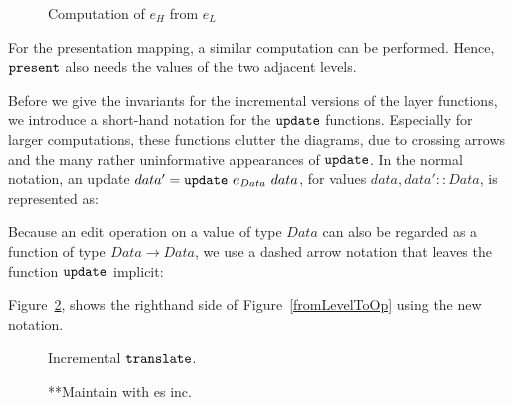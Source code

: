 \begin{figure}
\begin{small}
\begin{center}
\begin{center}
\end{center}\caption{Computation of $e_{H}$ from $e_{L}$}\label{computeOps} 
\end{center}
\end{small}
\end{figure}

For the presentation mapping, a similar computation can be performed. Hence, ${\tt present}$ also needs the values of the two adjacent levels. 

Before we give the invariants for the incremental versions of the layer functions, we introduce a short-hand notation for the ${\tt update}$ functions. Especially for larger computations, these functions clutter the diagrams, due to crossing arrows and the many rather uninformative appearances of ${\tt update}$. In the normal notation, an update $data' = {\tt update}~e_{Data}~data$, for values 
$data, data' :: Data$, is represented as:\\


\smallskip
Because an edit operation on a value of type $Data$ can also be regarded as a function of type 
$Data \rightarrow Data$, we use a dashed arrow notation that leaves the function ${\tt update}$ implicit:\\


Figure~\ref{incrementalTranslate}, shows the righthand side of Figure~\ref{fromLevelToOp} using the new notation.

\begin{figure}
\begin{small}
\begin{center}
\begin{center}
\end{center}\caption{Incremental ${\tt translate}$.}\label{incrementalTranslate} 
\end{center}
\end{small}
\end{figure}

\begin{figure}
\begin{center}
\begin{center}
\end{center}
\caption{**Maintain with es inc.}\label{layerExtraStateInc} 
\end{center}
\end{figure}

